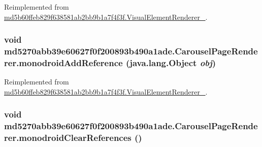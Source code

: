 Reimplemented from \hyperlink{classmd5b60ffeb829f638581ab2bb9b1a7f4f3f_1_1_visual_element_renderer__1_3ae26bd8575212fb6d6f14487b4f48d4}{md5b60ffeb829f638581ab2bb9b1a7f4f3f.VisualElementRenderer\_}.\hypertarget{classmd5270abb39e60627f0f200893b490a1ade_1_1_carousel_page_renderer_26e779e0778b3b8b22f6f7a8e20f1e7e}{
\subsubsection[{monodroidAddReference}]{\setlength{\rightskip}{0pt plus 5cm}void md5270abb39e60627f0f200893b490a1ade.CarouselPageRenderer.monodroidAddReference (java.lang.Object {\em obj})}}
\label{classmd5270abb39e60627f0f200893b490a1ade_1_1_carousel_page_renderer_26e779e0778b3b8b22f6f7a8e20f1e7e}




Reimplemented from \hyperlink{classmd5b60ffeb829f638581ab2bb9b1a7f4f3f_1_1_visual_element_renderer__1_321b2967faff34b0f7971f55915f583e}{md5b60ffeb829f638581ab2bb9b1a7f4f3f.VisualElementRenderer\_}.\hypertarget{classmd5270abb39e60627f0f200893b490a1ade_1_1_carousel_page_renderer_7f418b0c33eb2a6154244df3ce1ab3d0}{
\subsubsection[{monodroidClearReferences}]{\setlength{\rightskip}{0pt plus 5cm}void md5270abb39e60627f0f200893b490a1ade.CarouselPageRenderer.monodroidClearReferences ()}}
\label{classmd5270abb39e60627f0f200893b490a1ade_1_1_carousel_page_renderer_7f418b0c33eb2a6154244df3ce1ab3d0}





